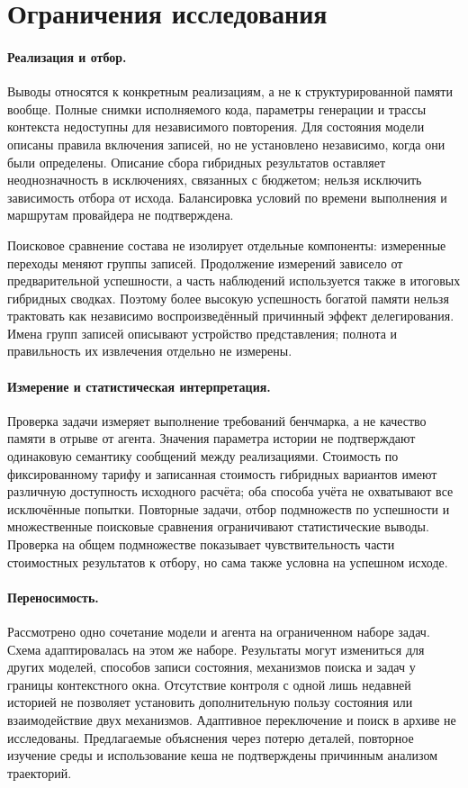 \section{Ограничения исследования}
\label{sec:threats}
\paragraph{Реализация и отбор.}
Выводы относятся к конкретным реализациям, а не к структурированной памяти вообще. Полные снимки исполняемого кода, параметры генерации и трассы контекста недоступны для независимого повторения. Для состояния модели описаны правила включения записей, но не установлено независимо, когда они были определены. Описание сбора гибридных результатов оставляет неоднозначность в исключениях, связанных с бюджетом; нельзя исключить зависимость отбора от исхода. Балансировка условий по времени выполнения и маршрутам провайдера не подтверждена.

Поисковое сравнение состава не изолирует отдельные компоненты: измеренные переходы меняют группы записей. Продолжение измерений зависело от предварительной успешности, а часть наблюдений используется также в итоговых гибридных сводках. Поэтому более высокую успешность богатой памяти нельзя трактовать как независимо воспроизведённый причинный эффект делегирования. Имена групп записей описывают устройство представления; полнота и правильность их извлечения отдельно не измерены.

\paragraph{Измерение и статистическая интерпретация.}
Проверка задачи измеряет выполнение требований бенчмарка, а не качество памяти в отрыве от агента. Значения параметра истории не подтверждают одинаковую семантику сообщений между реализациями. Стоимость по фиксированному тарифу и записанная стоимость гибридных вариантов имеют различную доступность исходного расчёта; оба способа учёта не охватывают все исключённые попытки. Повторные задачи, отбор подмножеств по успешности и множественные поисковые сравнения ограничивают статистические выводы. Проверка на общем подмножестве показывает чувствительность части стоимостных результатов к отбору, но сама также условна на успешном исходе.

\paragraph{Переносимость.}
Рассмотрено одно сочетание модели и агента на ограниченном наборе задач. Схема адаптировалась на этом же наборе. Результаты могут измениться для других моделей, способов записи состояния, механизмов поиска и задач у границы контекстного окна. Отсутствие контроля с одной лишь недавней историей не позволяет установить дополнительную пользу состояния или взаимодействие двух механизмов. Адаптивное переключение и поиск в архиве не исследованы. Предлагаемые объяснения через потерю деталей, повторное изучение среды и использование кеша не подтверждены причинным анализом траекторий.
